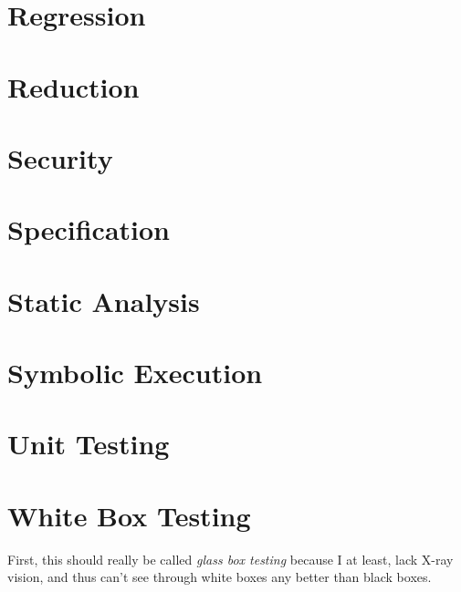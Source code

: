 \chapter{Regression}

\chapter{Reduction}

\chapter{Security}

\chapter{Specification}

\chapter{Static Analysis}

\chapter{Symbolic Execution}

\chapter{Unit Testing}

\chapter{White Box Testing}

First, this should really be called \emph{glass box testing} because I
at least, lack X-ray vision, and thus can't see through white boxes
any better than black boxes.
